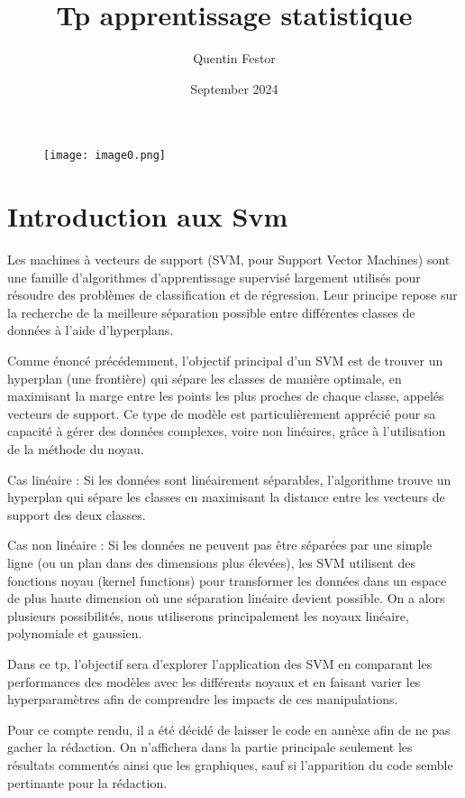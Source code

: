 \documentclass{article}
\title{Tp apprentissage statistique}
\author{Quentin Festor}
\date{September 2024}
\begin{document}
\begin{figure}
    \hfill %
    \texttt{[image: image0.png]} %
\end{figure}
\maketitle
\tableofcontents


\newpage

\section{Introduction aux Svm}
Les machines à vecteurs de support (SVM, pour Support Vector Machines) sont une famille d'algorithmes d'apprentissage supervisé largement utilisés pour résoudre des problèmes de classification et de régression. Leur principe repose sur la recherche de la meilleure séparation possible entre différentes classes de données à l'aide d'hyperplans.

Comme énoncé précédemment, l'objectif principal d'un SVM est de trouver un hyperplan (une frontière) qui sépare les classes de manière optimale, en maximisant la marge entre les points les plus proches de chaque classe, appelés vecteurs de support. Ce type de modèle est particulièrement apprécié pour sa capacité à gérer des données complexes, voire non linéaires, grâce à l'utilisation de la méthode du noyau.

Cas linéaire : Si les données sont linéairement séparables, l'algorithme trouve un hyperplan qui sépare les classes en maximisant la distance entre les vecteurs de support des deux classes.

Cas non linéaire : Si les données ne peuvent pas être séparées par une simple ligne (ou un plan dans des dimensions plus élevées), les SVM utilisent des fonctions noyau (kernel functions) pour transformer les données dans un espace de plus haute dimension où une séparation linéaire devient possible. On a alors plusieurs possibilités, nous utiliserons principalement les noyaux linéaire, polynomiale et gaussien. 

Dans ce tp, l'objectif sera d'explorer l'application des SVM en comparant les performances des modèles avec les différents noyaux et en faisant varier les hyperparamètres afin de comprendre les impacts de ces manipulations.

Pour ce compte rendu, il a été décidé de laisser le code en annèxe afin de ne pas gacher la rédaction. On n'affichera dans la partie principale seulement les résultats commentés ainsi que les graphiques, sauf si l'apparition du code semble pertinante pour la rédaction.
\end{document}
